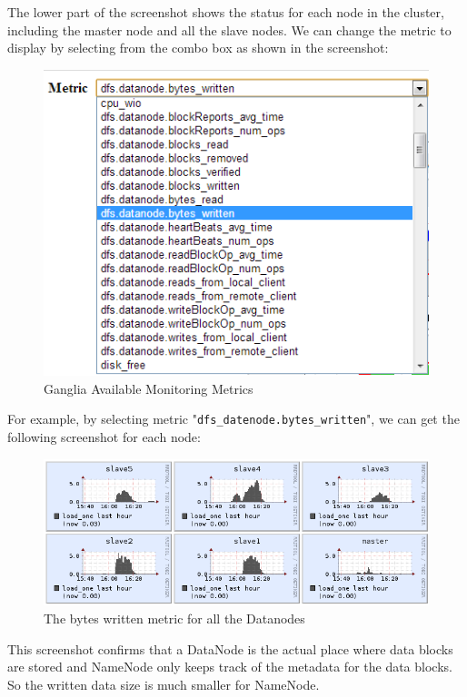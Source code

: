 The lower part of the screenshot shows the status for each node in the cluster, including the master node and all the slave nodes. We can change the metric to display by selecting from the combo box as shown in the screenshot:
\begin{figure}[h]
  \centering
  \includegraphics[width=.8\textwidth]{figs/5163os_06_09.png}
  \caption{Ganglia Available Monitoring Metrics}\label{fig:ganglia.metrics}
\end{figure} 

For example, by selecting metric "\verb|dfs_datenode.bytes_written|", we can get the following screenshot for each node:
\begin{figure}[h]
  \centering
  \includegraphics[width=.8\textwidth]{figs/5163os_06_10.png}
  \caption{The bytes written metric for all the Datanodes}\label{fig:bytes.written.metric}
\end{figure} 

This screenshot confirms that a DataNode is the actual place where data blocks are stored and NameNode only keeps track of the metadata for the data blocks. So the written data size is much smaller for NameNode.

